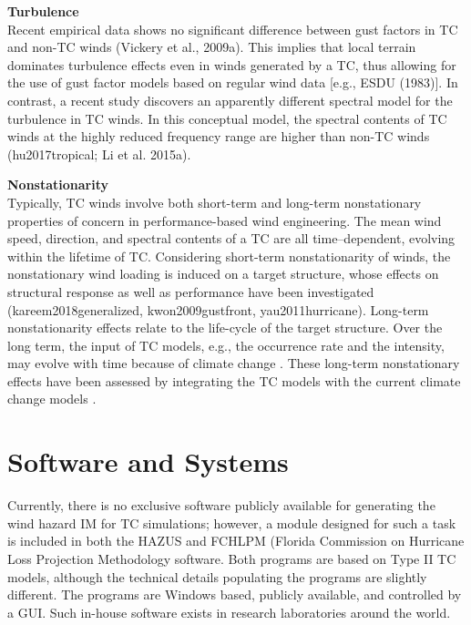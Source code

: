 \noindent\textbf{Turbulence} \\Recent empirical data shows no significant difference between gust factors in TC and non-TC winds (Vickery et al., 2009a). This implies that local terrain dominates turbulence effects even in winds generated by a TC, thus allowing for the use of gust factor models based on regular wind data [e.g., ESDU (1983)]. In contrast, a recent study discovers an apparently different spectral model for the turbulence in TC winds. In this conceptual model, the spectral contents of TC winds at the highly reduced frequency range are higher than non-TC winds (hu2017tropical; Li et al. 2015a).
\newline

\noindent\textbf{Nonstationarity} \\Typically, TC winds involve both short-term and long-term nonstationary properties of concern in performance-based wind engineering. The mean wind speed, direction, and spectral contents of a TC are all time–dependent, evolving within the lifetime of TC. Considering short-term nonstationarity of winds, the nonstationary wind loading is induced on a target structure, whose effects on structural response as well as performance have been investigated (kareem2018generalized, kwon2009gustfront, yau2011hurricane). Long-term nonstationarity effects relate to the life-cycle of the target structure. Over the long term, the input of TC models, e.g., the occurrence rate and the intensity, may evolve with time because of climate change \citep{emanuel2005increasing}. These long-term nonstationary effects have been assessed by integrating the TC models with the current climate change models \citep{emanuel2008hurricanes,lauren2014assessing,lin2015integrated,liu2014projections}.

\section{Software and Systems}
\label{sec:storm_wind_tools}

Currently, there is no exclusive software publicly available for generating the wind hazard IM for TC simulations; however, a module designed for such a task is included in both the HAZUS \citep{vickery2006hazusmh} and FCHLPM (Florida Commission on Hurricane Loss Projection Methodology \citep{hamid2010predicting, powell2005state} software. Both programs are based on Type II TC models, although the technical details populating the programs are slightly different. The programs are Windows based, publicly available, and controlled by a GUI. Such in-house software exists in research laboratories around the world.

%
